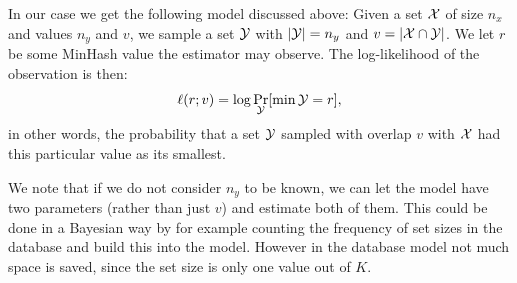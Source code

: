 
In our case we get the following model discussed above:
Given a set $\mathcal{X}$ of size $n_x$ and values $n_y$ and $v$, we sample a set $\mathcal{Y}$ with $|\mathcal{Y}|=n_y$ and $v=|\mathcal{X}\cap \mathcal{Y}|$.
We let $r$ be some MinHash value the estimator may observe.
The log-likelihood of the observation is then:
\[
   \ell(r; v) = \log\Pr_{\mathcal{Y}}[\min\mathcal{Y} = r],
\]
in other words, the probability that a set $\mathcal{Y}$ sampled with overlap $v$ with $\mathcal{X}$ had this particular value as its smallest.

We note that if we do not consider $n_y$ to be known, we can let the model have two parameters (rather than just $v$) and estimate both of them.
This could be done in a Bayesian way by for example counting the frequency of set sizes in the database and build this into the model.
However in the database model not much space is saved, since the set size is only one value out of $K$.

